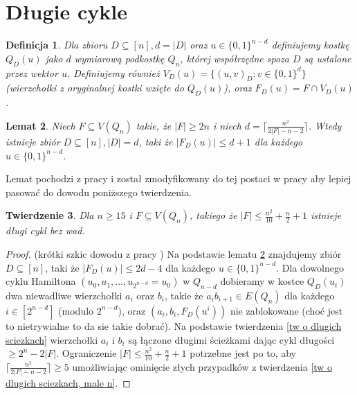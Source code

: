 \documentclass{pracamgr}
\newtheorem{theorem}{Twierdzenie}[chapter]
\newtheorem{defi}[theorem]{Definicja}
\newtheorem{lemma}[theorem]{Lemat}
\begin{document}
  \section{Długie cykle}
   \begin{defi}\label{przekrój kostki}
    Dla zbioru $D\subseteq[n], d=|D|$ oraz $u\in\{0,1\}^{n-d}$ definiujemy kostkę $Q_D(u)$ jako $d$ wymiarową podkostkę $Q_n$, której współrzędne spoza $D$
    są ustalone przez wektor $u$. Definiujemy również $V_D(u)=\{(u,v)_D:v\in\{0,1\}^d\}$ (wierzchołki z oryginalnej kostki wzięte do $Q_D(u)$), oraz
    $F_D(u)=F\cap V_D(u)$.
   \end{defi}
   \vspace*{10pt}
   \begin{lemma}\label{dlugi cykl - podzial kostki}
    Niech $F\subseteq V(Q_n)$ takie, że $|F|\ge 2n$ i niech $d=\lceil\frac{n^2}{2|F|-n-2}\rceil$.
    Wtedy istnieje zbiór $D\subseteq[n],|D|=d$, taki że $|F_D(u)|\le d+1$ dla każdego $u\in\{0,1\}^{n-d}$.
   \end{lemma}
   \vspace*{10pt}
   Lemat pochodzi z pracy \cite{Wie} i został zmodyfikowany do tej postaci w pracy \cite{FG} aby lepiej pasować do dowodu poniższego twierdzenia.
   \vspace*{10pt}
   \begin{theorem}\label{dlugi cykl - tw}
    Dla $n\ge15$ i $F\subseteq V(Q_n)$, takiego że $|F|\le\frac{n^2}{10}+\frac{n}{2}+1$ istnieje długi cykl bez wad.
   \end{theorem}
   \begin{proof}
    (krótki szkic dowodu z pracy \cite{FG})\newline
    Na podstawie lematu \ref{dlugi cykl - podzial kostki} znajdujemy zbiór $D\subseteq[n]$, taki że $|F_D(u)|\le 2d-4$ dla każdego $u\in\{0,1\}^{n-d}$.
    Dla dowolnego cyklu Hamiltona $(u_0,u_1,...,u_{2^{n-d}}=u_0)$ w $Q_{n-d}$ dobieramy w kostce $Q_D(u_i)$ dwa niewadliwe
    wierzchołki $a_i$ oraz $b_i$, takie że $a_ib_{i+1}\in E(Q_n)$ dla każdego $i\in[2^{n-d}]$ (modulo $2^{n-d}$),
    oraz $(a_i,b_i,F_D(u^i))$ nie zablokowane (choć jest to nietrywialne to da sie takie dobrać).
    Na podstawie twierdzenia \ref{tw o dlugich sciezkach} wierzchołki $a_i$ i $b_i$ są łączone długimi ścieżkami dając cykl długości $\ge 2^n-2|F|$.
    Ograniczenie $|F|\le\frac{n^2}{10}+\frac{n}{2}+1$ potrzebne jest po to, aby $\lceil\frac{n^2}{2|F|-n-2}\rceil\ge5$ umożliwiając ominięcie złych
    przypadków z twierdzenia \ref{tw o dlugich sciezkach, male n}.
   \end{proof}
\end{document}
